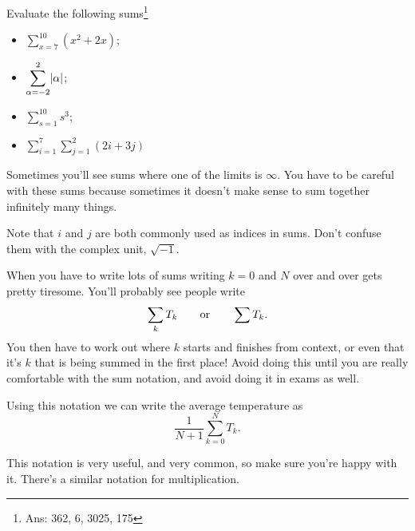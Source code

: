 \documentclass[fleqn]{LectureClass/LectureClass}
\begin{document}
    \begin{problem}{}{}
        Evaluate the following sums\footnote{Ans: 362, 6, 3025, 175}
        \begin{itemize}
            \item \(\displaystyle\sum_{x=7}^{10} (x^2 + 2x)\);
            \item \(\displaystyle\sum_{\alpha = -2}^{2} \lvert\alpha\rvert\);
            \item \(\displaystyle\sum_{s=1}^{10} s^3\);
            \item \(\displaystyle\sum_{i=1}^7 \sum_{j=1}^2 (2i + 3j)\)
        \end{itemize}
    \end{problem}
    
    \begin{wrn}
        Sometimes you'll see sums where one of the limits is \(\infty\).
        You have to be careful with these sums because sometimes it doesn't make sense to sum together infinitely many things.
    \end{wrn}
    
    \begin{wrn}
        Note that \(i\) and \(j\) are both commonly used as indices in sums.
        Don't confuse them with the complex unit, \(\sqrt{-1}\).
    \end{wrn}
    
    \begin{remark}{}{}
        When you have to write lots of sums writing \(k = 0\) and \(N\) over and over gets pretty tiresome.
        You'll probably see people write
        \begin{equation}
            \displaystyle \sum_{k} T_k \qquad\text{or}\qquad \sum T_k.
        \end{equation}
        You then have to work out where \(k\) starts and finishes from context, or even that it's \(k\) that is being summed in the first place!
        Avoid doing this until you are really comfortable with the sum notation, and avoid doing it in exams as well.
    \end{remark}
    
    Using this notation we can write the average temperature as
    \begin{equation}
        \frac{1}{N + 1} \sum_{k = 0}^{N} T_k.
    \end{equation}
    
    This notation is very useful, and very common, so make sure you're happy with it.
    There's a similar notation for multiplication.
    
\end{document}
